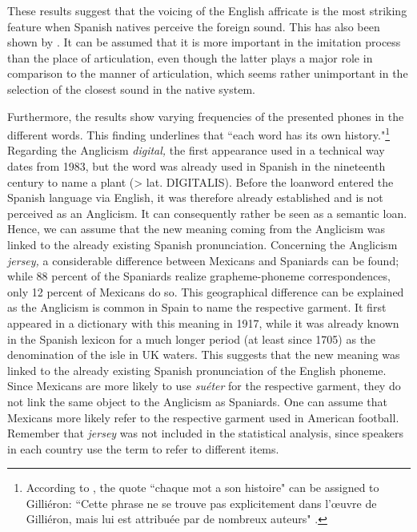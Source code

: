 \documentclass[output=paper]{langscibook}
\begin{document}
These results suggest that the voicing of the English affricate is the most striking feature when Spanish natives perceive the foreign sound. This has also been shown by \citet[29]{GomezCapuz2001}. It can be assumed that it is more important in the imitation process than the place of articulation, even though the latter plays a major role in comparison to the manner of articulation, which seems rather unimportant in the selection of the closest sound in the native system.

Furthermore, the results show varying frequencies of the presented phones in the different words. This finding underlines that “each word has its own history."\footnote{According to \citet[40]{Pustka2007}, the quote “chaque mot a son histoire" can be assigned to Gilliéron: “Cette phrase ne se trouve pas explicitement dans l’œuvre de Gilliéron, mais lui est attribuée par de nombreux auteurs" \citep[40]{Pustka2007}.}
Regarding the Anglicism \textit{digital,} the first appearance used in a technical way dates from 1983, but the word was already used in Spanish in the nineteenth century to name a plant (> lat. DIGITALIS). Before the loanword entered the Spanish language via English, it was therefore already established and is not perceived as an Anglicism. It can consequently rather be seen as a semantic loan. Hence, we can assume that the new meaning coming from the Anglicism was linked to the already existing Spanish pronunciation. Concerning the Anglicism \textit{jersey,} a considerable difference between Mexicans and Spaniards can be found; while 88 percent of the Spaniards realize grapheme-phoneme correspondences, only 12 percent of Mexicans do so. This geographical difference can be explained as the Anglicism is common in Spain to name the respective garment. It first appeared in a dictionary with this meaning in 1917, while it was already known in the Spanish lexicon for a much longer period (at least since 1705) as the denomination of the isle in UK waters. This suggests that the new meaning was linked to the already existing Spanish pronunciation of the English phoneme. Since Mexicans are more likely to use \textit{suéter} for the respective garment, they do not link the same object to the Anglicism as Spaniards. One can assume that Mexicans more likely refer to the respective garment used in American football. Remember that \textit{jersey} was not included in the statistical analysis, since speakers in each country use the term to refer to different items.
\end{document}

